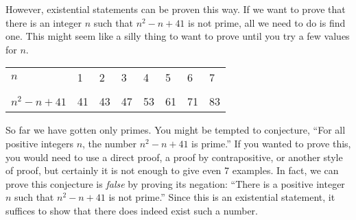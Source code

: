 \documentclass[10pt,]{book}
\theoremstyle{plain}
\theoremstyle{definition}
\theoremstyle{definition}
\theoremstyle{definition}
\numberwithin{equation}{chapter}
\newcommand{\hrulethin}  {\noalign{\hrule height 0.04em}}
\begin{document}
However, existential statements can be proven this way. If we want to prove that there is an integer \(n\) such that \(n^2-n+41\) is not prime, all we need to do is find one. This might seem like a silly thing to want to prove until you try a few values for \(n\).
%
\begin{tabular}{llllllll}
\(n\)&1&2&3&4&5&6&7\tabularnewline[0pt]
&&&&&&&\tabularnewline\hrulethin
\(n^2 - n + 41\)&41&43&47&53&61&71&83
\end{tabular}
\par

So far we have gotten only primes. You might be tempted to conjecture, ``For all positive integers \(n\), the number \(n^2 - n + 41\) is prime.'' If you wanted to prove this, you would need to use a direct proof, a proof by contrapositive, or another style of proof, but certainly it is not enough to give even 7 examples. In fact, we can prove this conjecture is \emph{false} by proving its negation: ``There is a positive integer \(n\) such that \(n^2 - n + 41\) is not prime.'' Since this is an existential statement, it suffices to show that there does indeed exist such a number.
%
\par
\end{document}
